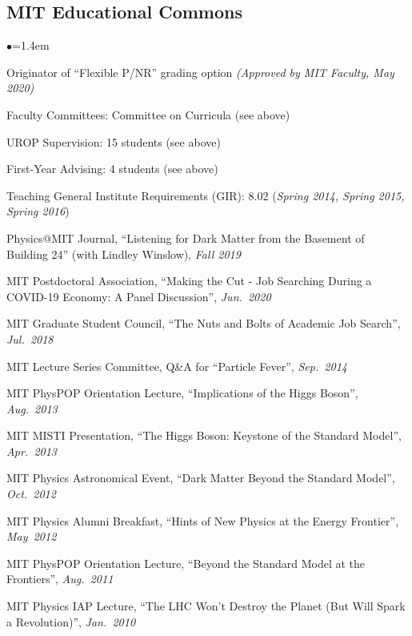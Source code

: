 \documentclass[11pt]{article}
\newcommand{\heading}[1]{\vspace{0in}\subsection*{#1} \vspace{.02in}}
\newcommand{\bbl}{\begin{list}{$\bullet$}{\leftmargin=1.4em \itemsep=-1pt}}
\newcommand{\el}{\end{list}}
\begin{document}

\heading{MIT Educational Commons}

\bbl
\item Originator of ``Flexible P/NR'' grading option \textit{(Approved by MIT Faculty, May 2020)}
\item Faculty Committees:  Committee on Curricula (see above)
\item UROP Supervision: 15 students (see above)
\item First-Year Advising:   4 students (see above)
\item Teaching General Institute Requirements (GIR):  8.02 (\textit{Spring 2014, Spring 2015, Spring 2016})
\item Physics@MIT Journal, ``Listening for Dark Matter from the Basement of Building 24'' (with Lindley Winslow), \textit{Fall 2019}
\item MIT Postdoctoral Association, ``Making the Cut - Job Searching During a COVID-19 Economy: A Panel Discussion'', \textit{Jun.~2020}
\item MIT Graduate Student Council, ``The Nuts and Bolts of Academic Job Search'', \textit{Jul.~2018}
\item MIT Lecture Series Committee, Q\&A for ``Particle Fever'', \textit{Sep.~2014}
\item MIT PhysPOP Orientation Lecture, ``Implications of the Higgs Boson'', \textit{Aug.~2013}
\item MIT MISTI Presentation, ``The Higgs Boson: Keystone of the Standard Model'', \textit{Apr.~2013}
\item MIT Physics Astronomical Event, ``Dark Matter Beyond the Standard Model'', \textit{Oct.~2012}
\item MIT Physics Alumni Breakfast, ``Hints of New Physics at the Energy Frontier'', \textit{May~2012}
\item MIT PhysPOP Orientation Lecture, ``Beyond the Standard Model at the Frontiers'', \textit{Aug.~2011}
\item MIT Physics IAP Lecture, ``The LHC Won't Destroy the Planet (But Will Spark a Revolution)'', \textit{Jan.~2010}
\el
\end{document}
